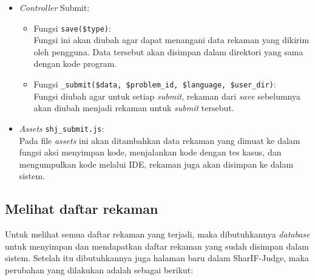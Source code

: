 \begin{itemize}
    \item \textit{Controller} Submit:
          \begin{itemize}
              \item Fungsi \verb|save($type)|: \\
                    Fungsi ini akan diubah agar dapat menangani data rekaman yang dikirim oleh pengguna. Data tersebut akan disimpan dalam direktori yang sama dengan kode program.
              \item Fungsi \verb|_submit($data, $problem_id, $language, $user_dir)|: \\
                    Fungsi diubah agar untuk setiap \textit{submit}, rekaman dari \textit{save} sebelumnya akan diubah menjadi rekaman untuk \textit{submit} tersebut.
          \end{itemize}
    \item \textit{Assets} \verb|shj_submit.js|: \\
          Pada file \textit{assets} ini akan ditambahkan data rekaman yang dimuat ke dalam fungsi aksi menyimpan kode, menjalankan kode dengan tes kasus, dan mengumpulkan kode melalui IDE, rekaman juga akan disimpan ke dalam sistem.
\end{itemize}

\subsection{Melihat daftar rekaman}
\label{sub:4:3:melihatdaftarrekaman}

Untuk melihat semua daftar rekaman yang terjadi, maka dibutuhkannya \textit{database} untuk menyimpan dan mendapatkan daftar rekaman yang sudah disimpan dalam sistem. Setelah itu dibutuhkannya juga halaman baru dalam SharIF-Judge, maka perubahan yang dilakukan adalah sebagai berikut:


